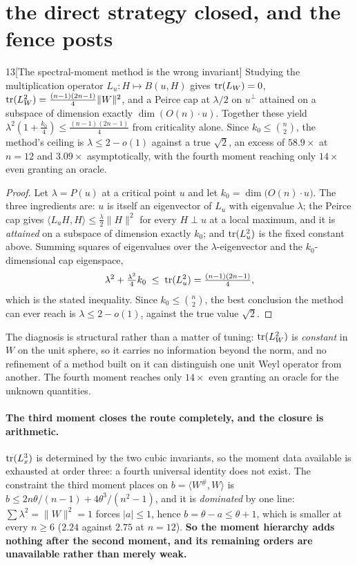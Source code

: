 \section{the direct strategy closed, and the fence posts}\label{sec:fenceposts}

\begin{Lem}{13}[The spectral-moment method is the wrong invariant]
Studying the multiplication operator $L_u\colon H\mapsto B(u,H)$ gives $\operatorname{tr}(L_W)=0$, $\operatorname{tr}(L_W^2)=\tfrac{(n-1)(2n-1)}4\|W\|^2$, and a Peirce cap at $\lambda/2$ on $u^\perp$ attained on a subspace of dimension exactly $\dim(O(n)\cdot u)$. Together these yield $\lambda^2(1+\tfrac{k_0}4)\le\tfrac{(n-1)(2n-1)}4$ from criticality alone. Since $k_0\le\binom n2$, the method's ceiling is $\lambda\le2-o(1)$ against a true $\sqrt2$, an excess of $58.9\times$ at $n=12$ and $3.09\times$ asymptotically, with the fourth moment reaching only $14\times$ even granting an oracle.
\end{Lem}

\begin{proof}
Let $\lambda=P(u)$ at a critical point $u$ and let $k_0=\dim\big(O(n)\cdot u\big)$. The three ingredients are: $u$ is itself an eigenvector of $L_u$ with eigenvalue $\lambda$; the Peirce cap gives $\langle L_uH,H\rangle\le\tfrac\lambda2\|H\|^2$ for every $H\perp u$ at a local maximum, and it is \emph{attained} on a subspace of dimension exactly $k_0$; and $\operatorname{tr}(L_u^2)$ is the fixed constant above. Summing squares of eigenvalues over the $\lambda$-eigenvector and the $k_0$-dimensional cap eigenspace,
\[
\lambda^2+\tfrac{\lambda^2}4k_0\;\le\;\operatorname{tr}(L_u^2)=\tfrac{(n-1)(2n-1)}4 ,
\]
which is the stated inequality. Since $k_0\le\binom n2$, the best conclusion the method can ever reach is $\lambda\le2-o(1)$, against the true value $\sqrt2$.
\end{proof}

The diagnosis is structural rather than a matter of tuning: $\operatorname{tr}(L_W^2)$ is \emph{constant} in $W$ on the unit sphere, so it carries no information beyond the norm, and no refinement of a method built on it can distinguish one unit Weyl operator from another. The fourth moment reaches only $14\times$ even granting an oracle for the unknown quantities.

\paragraph{The third moment closes the route completely, and the closure is arithmetic.} $\operatorname{tr}(L_x^3)$ is determined by the two cubic invariants, so the moment data available is exhausted at order three: a fourth universal identity does not exist. The constraint the third moment places on $b=\langle W^{\#},W\rangle$ is $b\le 2n\theta/(n-1)+4\theta^3/(n^2-1)$, and it is \emph{dominated} by one line: $\sum\lambda^2=\|W\|^2=1$ forces $|a|\le1$, hence $b=\theta-a\le\theta+1$, which is smaller at every $n\ge6$ ($2.24$ against $2.75$ at $n=12$). \textbf{So the moment hierarchy adds nothing after the second moment, and its remaining orders are unavailable rather than merely weak.}


